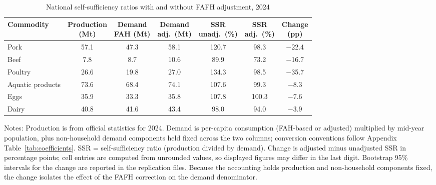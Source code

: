\documentclass[preprint,12pt,authoryear]{elsarticle}
\newcommand{\FAH}{\mathrm{FAH}}
\begin{document}
\begin{table}[htbp]
\centering
\begin{threeparttable}
\caption{National self-sufficiency ratios with and without FAFH adjustment, 2024}
\label{tab:ssr}
\footnotesize
\setlength{\tabcolsep}{0pt}
\begin{tabular*}{\textwidth}{@{\extracolsep{\fill}} l cccccc @{}}
\toprule
Commodity & \shortstack{Production\\(Mt)} & \shortstack{Demand\\FAH (Mt)} & \shortstack{Demand\\adj.\ (Mt)} & \shortstack{SSR\\unadj.\ (\%)} & \shortstack{SSR\\adj.\ (\%)} & \shortstack{Change\\(pp)} \\
\midrule
Pork             & 57.1 & 47.3 & 58.1 & 120.7 & 98.3 & $-$22.4 \\
Beef             & 7.8  & 8.7  & 10.6  & 89.9  & 73.2  & $-$16.7 \\
Poultry          & 26.6 & 19.8 & 27.0 & 134.3 & 98.5 & $-$35.7 \\
Aquatic products & 73.6 & 68.4 & 74.1 & 107.6 & 99.3 & $-$8.3 \\
Eggs             & 35.9 & 33.3 & 35.8 & 107.8 & 100.3 & $-$7.6 \\
Dairy            & 40.8 & 41.6 & 43.4 & 98.0  & 94.0  & $-$3.9 \\
\bottomrule
\end{tabular*}
\begin{tablenotes}[flushleft]
\scriptsize
\item Notes: Production is from official statistics for 2024. Demand is per-capita consumption (FAH-based or adjusted) multiplied by mid-year population, plus non-household demand components held fixed across the two columns; conversion conventions follow Appendix Table~\ref{tab:coefficients}. SSR = self-sufficiency ratio (production divided by demand). Change is adjusted minus unadjusted SSR in percentage points; cell entries are computed from unrounded values, so displayed figures may differ in the last digit. Bootstrap 95\% intervals for the change are reported in the replication files. Because the accounting holds production and non-household components fixed, the change isolates the effect of the FAFH correction on the demand denominator.
\end{tablenotes}
\end{threeparttable}
\end{table}
\end{document}
